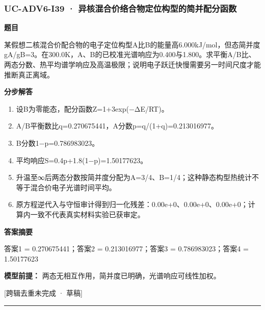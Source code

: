 \documentclass[UTF8,11pt,a4paper]{ctexart}
\begin{document}
\subsubsection*{UC-ADV6-I39 · 异核混合价络合物定位构型的简并配分函数}
\noindent\textbf{题目}\par
某假想二核混合价配合物的电子定位构型A比B的能量高6.000kJ/mol，但态简并度gA/gB=3。在300.0K，A、B的已校准光谱响应为0.400与1.800。求平衡A/B比、两态分数、热平均谱学响应及高温极限；说明电子跃迁快慢需要另一时间尺度才能推断真正离域。\par
\medskip\noindent\textbf{分步解答}
\begin{enumerate}
\item 设B为零能态，配分函数Z=1+3exp(−ΔE/RT)。
\item A/B平衡数比q=0.270675441，A分数p=q/(1+q)=0.213016977。
\item B分数1−p=0.786983023。
\item 平均响应S=0.4p+1.8(1−p)=1.50177623。
\item 升温至∞后两态分数按简并度分配为A=3/4、B=1/4；这种静态构型热统计不等于混合价电子光谱时间平均。
\item 原方程逆代入与守恒审计得到归一化残差：0.00e+0、0.00e+0、0.00e+0；计算内一致不代表真实材料实验已获审定。
\end{enumerate}
\noindent\textbf{答案摘要}\par
答案1 = 0.270675441；答案2 = 0.213016977；答案3 = 0.786983023；答案4 = 1.50177623\par
\noindent\textbf{模型前提：}
两态无相互作用，简并度已明确，光谱响应可线性加权。\par
\noindent\textcolor{red!65!black}{[跨辑去重未完成 · 草稿]} \par
\medskip\hrule\medskip
{}
\end{document}
